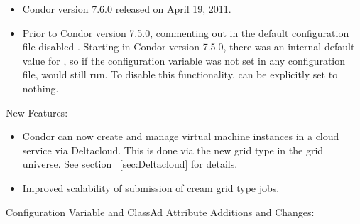 \begin{itemize}

\item Condor version 7.6.0 released on April 19, 2011.

\item Prior to Condor version 7.5.0, commenting out  in the
  default configuration file disabled .  
  Starting in Condor version 7.5.0,
  there was an internal default value for , so if
  the configuration variable was not set in any configuration file,
   would still run.
  To disable this functionality,  can be explicitly set to
  nothing.

\end{itemize}


\noindent New Features:

\begin{itemize}

\item Condor can now create and manage virtual machine instances in a
cloud service via Deltacloud. This is done via the new
 grid type in the grid universe.
See section ~\ref{sec:Deltacloud} for details.

\item Improved scalability of submission of cream grid type jobs.

\end{itemize}

\noindent Configuration Variable and ClassAd Attribute Additions and Changes:


